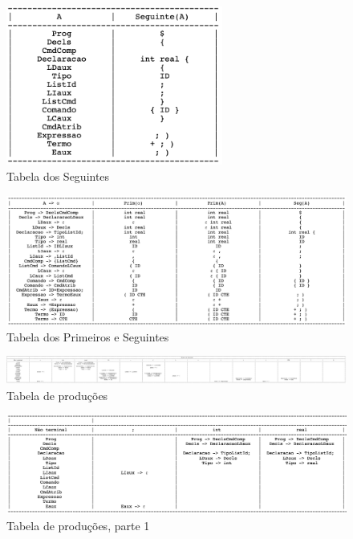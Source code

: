 \documentclass[a4paper, 10pt]{article}
\begin{document}
\begin{figure}
  \begin{center}
  \includegraphics[width=2.8in]{./../output/quest32.png}
  \caption{Tabela dos Seguintes}
  \label{fig:quest32}
  \end{center}
\end{figure}

\begin{figure}
  \begin{center}
  \includegraphics[width=\linewidth]{./../output/quest33.png}
  \caption{Tabela dos Primeiros e Seguintes}
  \label{fig:quest33}
  \end{center}
\end{figure}

\begin{figure}
  \begin{center}
  \includegraphics[width=\linewidth]{./../output/quest34.png}
  \caption{Tabela de produções}
  \label{fig:quest34}
  \end{center}
\end{figure}

\begin{figure}
  \begin{center}
  \includegraphics[width=\linewidth]{./../output/quest35.png}
  \caption{Tabela de produções, parte 1}
  \label{fig:quest35}
  \end{center}
\end{figure}
\end{document}
